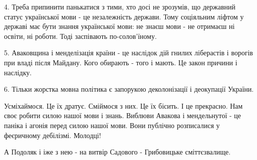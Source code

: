 4. Треба припинити панькатися з тими, хто досі не зрозумів, що державний статус
української мови - це незалежність держави. Тому соціяльним ліфтом у державі
має бути знання української мови: не знаєш мови - не отримаєш ні освіти, ні
роботи. Тоді заспівають по-солов'їному.

5. Аваковщина і менделізація країни - це наслідок дій гнилих ліберастів і
ворогів при владі після Майдану. Кого обирають - того і мають. Це закон причини
і наслідку.

6. Тільки жорстка мовна політика є запорукою деколонізації і деокупації
України.

Усміхаймося. Це їх дратує. Сміймося з них. Це їх бісить. І це прекрасно. Нам
своє робити силою нашої мови і знань. Виблюви Авакова і мендельнутої - це
паніка і агонія перед силою нашої мови. Вони публічно розписалися у феєричному
дебілізмі. Молодці!

А Подоляк і іже з нею - на витвір Садового -  Грибовицьке сміттєзвалище.
